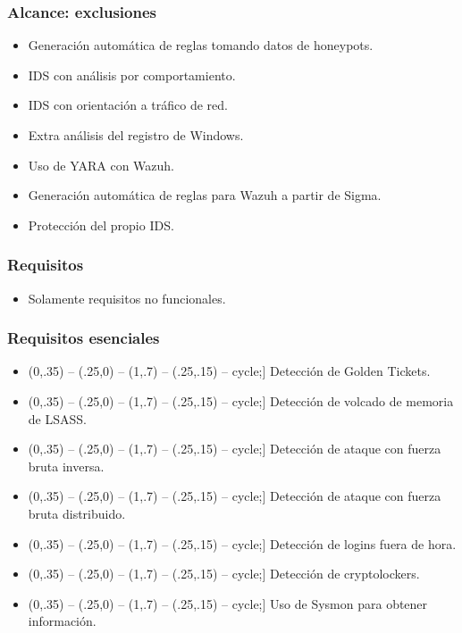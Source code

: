 \documentclass[a4paper,10pt]{beamer}
\def\checkmark{\tikz\fill[scale=0.4,color=black!30!green](0,.35) -- (.25,0) -- (1,.7) -- (.25,.15) -- cycle;}
\begin{document}
\begin{frame}[fragile]
	\frametitle{Alcance: exclusiones}

	\begin{itemize}
		\item Generación automática de reglas tomando datos de honeypots.
		\item IDS con análisis por comportamiento.
		\item IDS con orientación a tráfico de red.
		\item Extra análisis del registro de Windows.
		\item Uso de YARA con Wazuh.
		\item Generación automática de reglas para Wazuh a partir de Sigma.
		\item Protección del propio IDS.
	\end{itemize}
\end{frame}

\begin{frame}[fragile]
	\frametitle{Requisitos}

	\begin{itemize}
		\item Solamente requisitos no funcionales. %
	\end{itemize}
\end{frame}

\begin{frame}[fragile]
	\frametitle{Requisitos esenciales}

	\begin{itemize}
		\item[\checkmark] Detección de Golden Tickets.
		\item[\checkmark] Detección de volcado de memoria de LSASS.
		\item[\checkmark] Detección de ataque con fuerza bruta inversa.
		\item[\checkmark] Detección de ataque con fuerza bruta distribuido.
		\item[\checkmark] Detección de logins fuera de hora.
		\item[\checkmark] Detección de cryptolockers.
		\item[\checkmark] Uso de Sysmon para obtener información.
	\end{itemize}
\end{frame}
\end{document}

